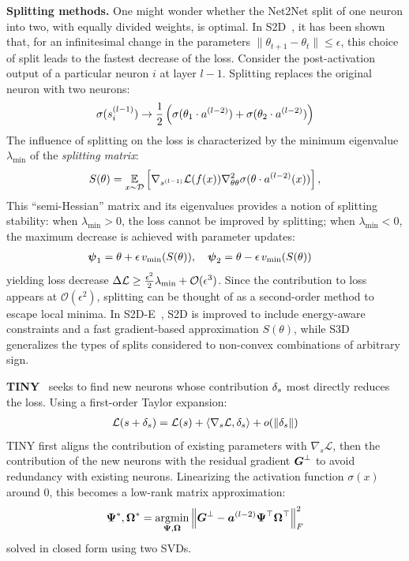 \textbf{Splitting methods.} One might wonder whether the Net2Net split of one neuron into two, with equally divided weights, is optimal. In S2D~\citep{liu_splitting_2019}, it has been shown that, for an infinitesimal change in the parameters $\|\theta_{t+1} - \theta_t\| \le \epsilon$, this choice of split leads to the fastest decrease of the loss. Consider the post-activation output of a particular neuron $i$ at layer $l-1$. Splitting replaces the original neuron with two neurons:
\begin{align}
    \sigma(\preact[l-1]_i) \to \frac{1}{2} \left( \sigma(\theta_1 \cdot \postact[l-2] ) + \sigma(\theta_2 \cdot \postact[l-2]) \right)
\end{align}
The influence of splitting on the loss is characterized by the minimum eigenvalue $\lambda_{\min}$ of the \emph{splitting matrix}:
\begin{equation}\label{eqn:splitting}
S(\theta) = \underset{x \sim \D}{\mathbb{E}}\left[ \nabla_{\preact[l-1]} \loss(f(x)) \nabla_{\theta\theta}^2 \sigma(\theta \cdot \postact[l-2](x)) \right],
\end{equation}
This ``semi-Hessian'' matrix and its eigenvalues provides a notion of splitting stability: when $\lambda_{\min} > 0$, the loss cannot be improved by splitting; when $\lambda_{\min} < 0$, the maximum decrease is achieved with parameter updates:
\begin{align}
\fanin_{1} &= \theta + \epsilon\, v_{\min}(S(\theta)), \quad
\fanin_{2} = \theta - \epsilon\, v_{\min}(S(\theta))
\end{align}
yielding loss decrease $\Delta \loss \geq \frac{\epsilon^2}{2} \lambda_{\min} + \mathcal{O}(\epsilon^3)$. Since the contribution to loss appears at $\mathcal{O}(\epsilon^2)$, splitting can be thought of as a second-order method to escape local minima. In S2D-E~\citep{wang_energy-aware_2020}, S2D is improved to include energy-aware constraints and a fast gradient-based approximation $S(\theta)$, while S3D~\citep{wu_steepest_2021} generalizes the types of splits considered to non-convex combinations of arbitrary sign.

\textbf{TINY}~\citep{verbockhaven_growing_2024} seeks to find new neurons whose contribution $\deltas$ most directly reduces the loss. Using a first-order Taylor expansion:
\begin{align}
    \mathcal{L}(s + \deltas) = \mathcal{L}(s) + \langle \nabla_s \mathcal{L}, \deltas \rangle + o(\|\deltas\|)
\end{align}
TINY first aligns the contribution of existing parameters with $\nabla_s \mathcal{L}$, then the contribution of the new neurons with the residual gradient $\Bottleneck$ to avoid redundancy with existing neurons. Linearizing the activation function $\sigma(x)$ around $0$, this becomes a low-rank matrix approximation:
\begin{align}\label{eq:tiny_main}
\Fanin^*, \Fanout^* = \argmin_{\Fanin, \Fanout} \frob{\Bottleneck - \Postact[l-2] \trans{\Fanin} \trans{\Fanout}}^2
\end{align}
solved in closed form using two SVDs.

